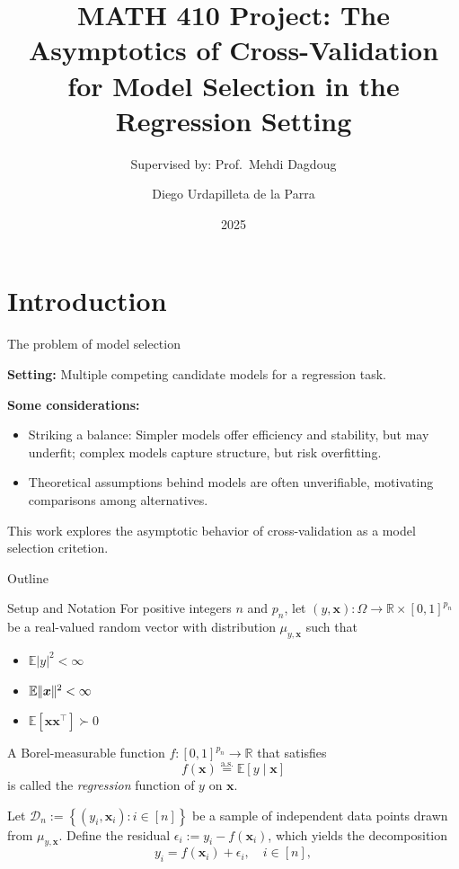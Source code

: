 \documentclass{beamer}
\title[CV for Selection]{MATH 410 Project: The Asymptotics of Cross-Validation for Model Selection in the Regression Setting}
\author[Diego Urdapilleta]{Diego Urdapilleta de la Parra}
\subtitle{Supervised by: Prof.\ Mehdi Dagdoug}
\institute[McGill]{McGill University}
\date{2025}
\newcommand{\R}{\mathbb{R}}
\newcommand{\0}{\emptyset}
\newcommand{\E}{\mathbb{E}}
\newcommand{\Ep}[1]{\mathbb{E}\left[ #1 \right]}
\newcommand{\paren}[1]{\left(#1 \right)}
\newcommand{\set}[1]{\left\{ #1 \right\}}
\newcommand{\norm}[1]{|\hspace{-1pt}|#1 |\hspace{-1pt}|}
\newcommand{\normsq}[1]{\norm{#1}^{2}}
\newcommand{\data}{\mathcal{D}_{n}}
\newcommand{\aseq}{\stackrel{\mathrm{a.s.}}{=}}
\newcommand{\x}{\boldsymbol{x}}
\newcommand{\1}{\mathmybb{1}}
\begin{document}
\begin{frame}
  \titlepage{}
\end{frame}

\section{Introduction}
\begin{frame}{The problem of model selection}

    \textbf{Setting: } Multiple competing candidate models for a regression task.

    \textbf{Some considerations:}
    \begin{itemize}
        \item Striking a balance: Simpler models offer efficiency and stability, but may underfit; complex models capture structure, but risk overfitting.

        \item Theoretical assumptions behind models are often unverifiable, motivating comparisons among alternatives.
    \end{itemize}

    This work explores the asymptotic behavior of cross-validation as a model selection critetion.
\end{frame}

\begin{frame}{Outline}
    \tableofcontents
  \end{frame}

\begin{frame}{Setup and Notation}
    For positive integers $n$ and $p_{n}$, let $(y, \x):\Omega\to\R\times{[0,1]}^{p_{n}}$ be a real-valued random vector with distribution $\mu_{y, \x}$ such that 
    \begin{itemize}
        \item $\E{|y|^{2}}<\infty$
        \item $\E\normsq{\x}<\infty$
        \item $\Ep{\x\x^{\top}}\succ 0$
    \end{itemize}

    A Borel-measurable function \(f:{[0,1]}^{p_{n}} \to \R\) that satisfies
    \[f(\x) \aseq \Ep{y\mid \x}\]
    is called the \emph{regression} function of \(y\) on \(\x\). 
  
    Let \(\data := \set{\paren{y_{i}, \x_{i}}:i\in [n]}\) be a sample of independent data points drawn from \(\mu_{y, \x}\).
    Define the residual \(\epsilon_{i}:= y_{i} - f(\x_{i})\), which yields the decomposition
  \[y_{i} = f(\x_{i}) + \epsilon_{i}, \quad i\in[n],\]
\end{frame}
\end{document}
